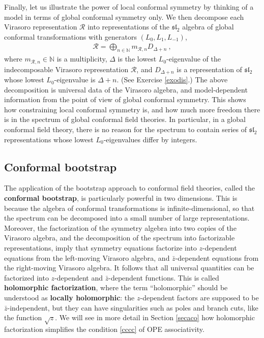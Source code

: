 \documentclass[12pt, a4paper, notitlepage, twoside]{report}
\numberwithin{equation}{section}
\theoremstyle{break}
\begin{document}
Finally, let us illustrate the power of local conformal symmetry by thinking of a model in terms of global conformal symmetry only. 
We then decompose each Virasoro representation $\mathcal{R}$ into representations of the $\mathfrak{sl}_2$ algebra of global conformal transformations with generators $(L_0,L_1,L_{-1})$,
\begin{align}
 \mathcal{R}=\bigoplus_{n\in{\mathbb{N}}} m_{\mathcal{R},n} D_{\Delta+n}\ ,
\label{rbd}
\end{align}
where $m_{\mathcal{R},n}\in {\mathbb{N}}$ is a multiplicity, $\Delta$ is the lowest $L_0$-eigenvalue of the indecomposable Virasoro representation $\mathcal{R}$, and $D_{\Delta+n}$ is a representation of $\mathfrak{sl}_2$ whose lowest $L_0$-eigenvalue is $\Delta+n$.
(See Exercise \ref{exodis}.)
The above decomposition is universal data of the Virasoro algebra, and 
model-dependent information from the point of view of global conformal symmetry.
This shows how constraining local conformal symmetry is, and how much more freedom there is in the spectrum of global conformal field theories.
In particular, in a global conformal field theory, there is no reason for the spectrum to contain series of
$\mathfrak{sl}_2$ representations whose lowest $L_0$-eigenvalues differ by integers. 


\subsection{Conformal bootstrap}

The application of the bootstrap approach to conformal field theories, called the \textbf{conformal bootstrap}, 
is particularly powerful in two dimensions.
This is because the algebra of conformal transformations is infinite-dimensional, 
so that the spectrum can be decomposed into a small number of large representations.
Moreover, the factorization of the symmetry algebra into two copies of the Virasoro algebra, and the decomposition of the spectrum into factorizable representations,
imply that symmetry equations factorize into $z$-dependent equations from the left-moving Virasoro algebra, and $\bar{z}$-dependent equations from the right-moving Virasoro algebra.
It follows that all universal quantities can be factorized into $z$-dependent and $\bar{z}$-dependent functions. 
This is called \textbf{\boldmath holomorphic factorization}, where the term ``holomorphic''
should be understood as \textbf{\boldmath locally holomorphic}: the $z$-dependent factors are supposed to be $\bar{z}$-independent, but they can have singularities such as poles and branch cuts, like the function $\sqrt{z}$.
We will see in more detail in Section \ref{secaco} how holomorphic factorization simplifies the condition \eqref{cccc} of OPE associativity.
\end{document}
